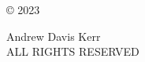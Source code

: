 \begin{center}
\thispagestyle{empty}
\vspace*{7in}

© 2023

Andrew Davis Kerr \\
ALL RIGHTS RESERVED

\end{center}
\clearpage